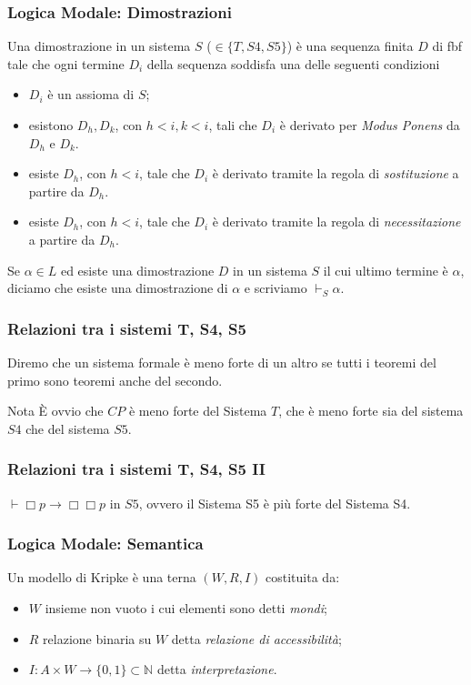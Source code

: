 \documentclass[notheorem]{beamer}
\begin{document}
\begin{frame}
\frametitle{Logica Modale: Dimostrazioni}
Una dimostrazione in un sistema $S$ ($\in \{ T, S4, S5\}$)  è una sequenza finita $D$ di fbf tale che
ogni termine $D_i$ della sequenza soddisfa una delle seguenti condizioni
\begin{itemize}
\item $D_i$ è un assioma di $S$;
\item esistono $D_h, D_k$, con $h < i, k < i$, tali che $D_i$ è derivato per \emph{Modus Ponens}
da $D_h$ e $D_k$.
\item esiste $D_h$, con $h < i$, tale che $D_i$ è derivato tramite
la regola di \emph{sostituzione} a partire da $D_h$.
\item {\color{red} esiste $D_h$, con $h < i$, tale che $D_i$ è derivato tramite
la regola di \emph{necessitazione} a partire da $D_h$}.
\end{itemize}

Se $\alpha \in L$ ed esiste una dimostrazione $D$ in un sistema $S$ il cui ultimo termine è $\alpha$,
diciamo che esiste una dimostrazione di $\alpha$ e scriviamo $\vdash_S \alpha$.
\end{frame}

\begin{frame}
\frametitle{Relazioni tra i sistemi T, S4, S5}
\begin{definition}
Diremo che un sistema formale è meno forte di un altro se tutti i teoremi del primo
sono teoremi anche del secondo.
\end{definition}

\begin{block}{Nota}
È ovvio che $CP$ è meno forte del Sistema $T$, che è meno forte sia del sistema $S4$
che del sistema $S5$.
\end{block}
\end{frame}

\begin{frame}
\frametitle{Relazioni tra i sistemi T, S4, S5 II}
\begin{theorem}
$\vdash \Box p \rightarrow \Box \Box p$ in $S5$, ovvero il Sistema S5 è più forte del Sistema S4.
\end{theorem}
\end{frame}

\begin{frame}
\frametitle{Logica Modale: Semantica}

Un modello di Kripke è una terna $(W, R, I)$ costituita da:
\begin{itemize}
\item $W$ insieme non vuoto i cui elementi sono detti \emph{mondi};
\item $R$ relazione binaria su $W$ detta \emph{relazione di accessibilità};
\item $I : A \times W \to \{0, 1\} \subset \mathbb{N}$ detta \emph{interpretazione}.
\end{itemize}
\end{frame}
\end{document}
